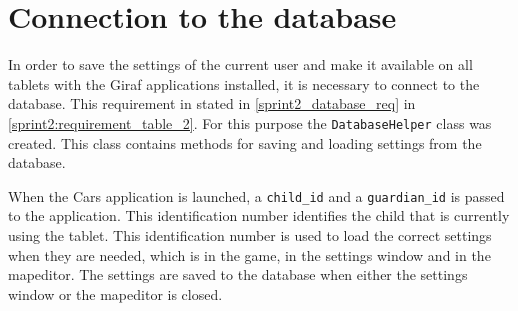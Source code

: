 \section{Connection to the database}
\label{sprint3:database}
In order to save the settings of the current user and make it available on all tablets with the Giraf applications installed, it is necessary to connect to the database.
This requirement in stated in \cref{sprint2_database_req} in \cref{sprint2:requirement_table_2}.
For this purpose the \lstinline!DatabaseHelper! class was created.
This class contains methods for saving and loading settings from the database. 

When the Cars application is launched, a \lstinline!child_id! and a \lstinline!guardian_id! is passed to the application. 
This identification number identifies the child that is currently using the tablet.
This identification number is used to load the correct settings when they are needed, which is in the game, in the settings window and in the mapeditor.
The settings are saved to the database when either the settings window or the mapeditor is closed.